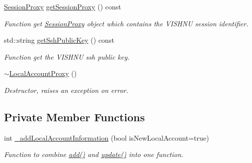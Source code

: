 \begin{DoxyCompactItemize}
\hyperlink{classSessionProxy}{SessionProxy} \hyperlink{classLocalAccountProxy_adb256b866b27f0da5d376e33f2cf936f}{getSessionProxy} () const 
\begin{DoxyCompactList}\small\item\em Function get \hyperlink{classSessionProxy}{SessionProxy} object which contains the VISHNU session identifier. \item\end{DoxyCompactList}\item 
std::string \hyperlink{classLocalAccountProxy_a66e3dc4756c8e8386d9344f36a84254a}{getSshPublicKey} () const 
\begin{DoxyCompactList}\small\item\em Function get the VISHNU ssh public key. \item\end{DoxyCompactList}\item 
\hypertarget{classLocalAccountProxy_abfba202797b0862a6c5336b4a4e2d005}{
\hyperlink{classLocalAccountProxy_abfba202797b0862a6c5336b4a4e2d005}{$\sim$LocalAccountProxy} ()}
\label{classLocalAccountProxy_abfba202797b0862a6c5336b4a4e2d005}

\begin{DoxyCompactList}\small\item\em Destructor, raises an exception on error. \item\end{DoxyCompactList}\end{DoxyCompactItemize}
\subsection*{Private Member Functions}
\begin{DoxyCompactItemize}
\item 
int \hyperlink{classLocalAccountProxy_a80bbacfc52c341153c6a1aefc20b3dff}{\_\-addLocalAccountInformation} (bool isNewLocalAccount=true)
\begin{DoxyCompactList}\small\item\em Function to combine \hyperlink{classLocalAccountProxy_a0676a2d914681e61a401e5cb60ccd0ad}{add()} and \hyperlink{classLocalAccountProxy_adfa887a4617b82987d06bccba52b1950}{update()} into one function. \item\end{DoxyCompactList}\end{DoxyCompactItemize}
